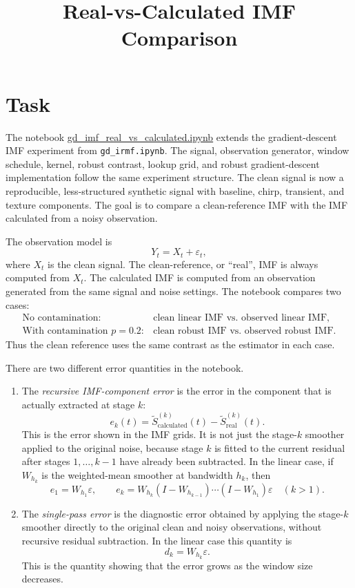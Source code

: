 \documentclass[11pt]{article}
\title{Real-vs-Calculated IMF Comparison}
\author{}
\date{}
\begin{document}
\maketitle

\section{Task}

The notebook
\href{https://github.com/mkuziuk/imf/blob/main/gd_imf_real_vs_calculated.ipynb}{gd\_imf\_real\_vs\_calculated.ipynb}
extends the gradient-descent IMF experiment from
\texttt{gd\_irmf.ipynb}. The signal, observation generator, window schedule,
kernel, robust contrast, lookup grid, and robust gradient-descent implementation
follow the same experiment structure. The clean signal is now a reproducible,
less-structured synthetic signal with baseline, chirp, transient, and texture
components. The goal is to compare a clean-reference IMF with the IMF calculated
from a noisy observation.

The observation model is
\[
Y_t = X_t + \varepsilon_t,
\]
where \(X_t\) is the clean signal. The clean-reference, or ``real'', IMF is always
computed from \(X_t\). The calculated IMF is computed from an observation generated
from the same signal and noise settings. The notebook compares two cases:
\[
\begin{array}{ll}
\text{No contamination:} & \text{clean linear IMF vs. observed linear IMF}, \\
\text{With contamination }p=0.2: & \text{clean robust IMF vs. observed robust IMF}.
\end{array}
\]
Thus the clean reference uses the same contrast as the estimator in each case.\newline

There are two different error quantities in the notebook.

\begin{enumerate}
\item The \emph{recursive IMF-component error} is the error in the component that
is actually extracted at stage \(k\):
\[
e_k(t)=\widetilde S^{(k)}_{\mathrm{calculated}}(t)
-\widetilde S^{(k)}_{\mathrm{real}}(t).
\]
This is the error shown in the IMF grids. It is not just the stage-\(k\) smoother
applied to the original noise, because stage \(k\) is fitted to the current
residual after stages \(1,\ldots,k-1\) have already been subtracted. In the linear
case, if \(W_{h_k}\) is the weighted-mean smoother at bandwidth \(h_k\), then
\[
e_1 = W_{h_1}\varepsilon,
\qquad
e_k =
W_{h_k}(I-W_{h_{k-1}})\cdots(I-W_{h_1})\varepsilon
\quad (k>1).
\]

\item The \emph{single-pass error} is the diagnostic error obtained by applying
the stage-\(k\) smoother directly to the original clean and noisy observations,
without recursive residual subtraction. In the linear case this quantity is
\[
d_k = W_{h_k}\varepsilon.
\]
This is the quantity showing that the error grows as the window size decreases.
\end{enumerate}
\end{document}
